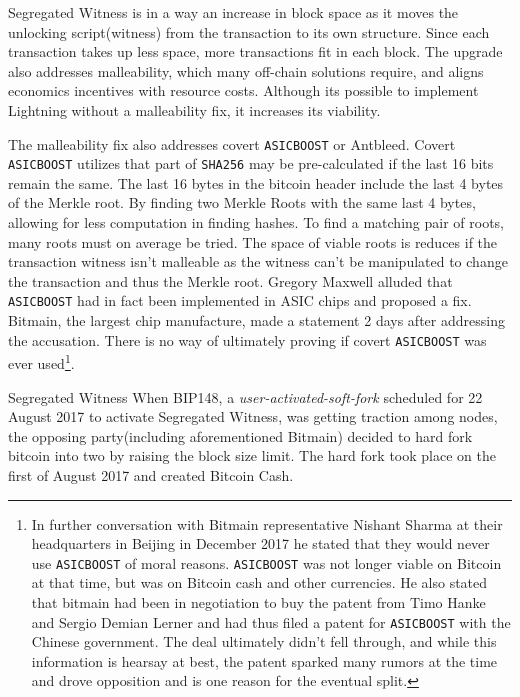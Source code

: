 Segregated Witness is in a way an increase in block space as it moves the unlocking script(witness) from the transaction to its own structure. Since each transaction takes up less space, more transactions fit in each block. The upgrade also addresses malleability, which many off-chain solutions require, and aligns economics incentives with resource costs\cite{antonopoulos:segregated:witness:align:economic:incentives}. Although its possible to implement Lightning without a malleability fix, it increases its viability\cite{song:lightning:malleability}.

The malleability fix also addresses covert \texttt{ASICBOOST} or Antbleed. Covert \texttt{ASICBOOST} utilizes that part of \texttt{SHA256} may be pre-calculated if the last 16 bits remain the same. The last 16 bytes in the bitcoin header include the last 4 bytes of the Merkle root. By finding two Merkle Roots with the same last 4 bytes, allowing for less computation in finding hashes. To find a matching pair of roots, many roots must on average be tried. The space of viable roots is reduces if the transaction witness isn't malleable\cite{song:asicboost} as the witness can't be manipulated to change the transaction and thus the Merkle root. Gregory Maxwell alluded that \texttt{ASICBOOST} had in fact been implemented in ASIC chips and proposed a fix\cite{maxwell:asicboost:fix}. Bitmain, the largest chip manufacture, made a statement 2 days after addressing the accusation\cite{bitmain:response}. There is no way of ultimately proving if covert \texttt{ASICBOOST} was ever used\footnote{In further conversation with Bitmain representative Nishant Sharma at their headquarters in Beijing in December 2017 he stated that they would never use \texttt{ASICBOOST} of moral reasons. \texttt{ASICBOOST} was not longer viable on Bitcoin at that time, but was on Bitcoin cash and other currencies. He also stated that bitmain had been in negotiation to buy the patent from Timo Hanke and Sergio Demian Lerner and had thus filed a patent for \texttt{ASICBOOST} with the Chinese government. The deal ultimately didn't fell through, and while this information is hearsay at best, the patent sparked many rumors at the time and drove opposition and is one reason for the eventual split.}. 

Segregated Witness When BIP148\cite{bip:148:uasf:segwit}, a \textit{user-activated-soft-fork} scheduled for 22 August 2017 to activate Segregated Witness, was getting traction among nodes, the opposing party(including aforementioned Bitmain) decided to hard fork bitcoin into two by raising the block size limit. The hard fork took place on the first of August 2017 and created Bitcoin Cash.

